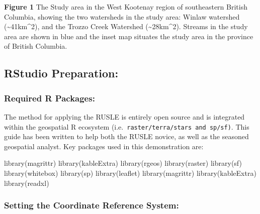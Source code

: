 \documentclass[
]{article}
\newenvironment{Shaded}{\begin{snugshade}}{\end{snugshade}}
\newcommand{\FunctionTok}[1]{\textcolor[rgb]{0.00,0.00,0.00}{#1}}
\newcommand{\NormalTok}[1]{#1}
\begin{document}
\textbf{Figure 1} The Study area in the West Kootenay region of southeastern British Columbia, showing the two watersheds in the study area: Winlaw watershed (\textasciitilde41km\^{}2), and the Trozzo Creek Watershed (\textasciitilde28km\^{}2). Streams in the study area are shown in blue and the inset map situates the study area in the province of British Columbia.

\hypertarget{sec-required-r-packages}{%
\subsection*{RStudio Preparation:}\label{sec-required-r-packages}}

\hypertarget{packages}{%
\subsubsection*{Required R Packages:}\label{packages}}

The method for applying the RUSLE is entirely open source and is integrated within the geospatial R ecosystem (i.e.~\texttt{raster/terra/stars\ and\ sp/sf)}. This guide has been written to help both the RUSLE novice, as well as the seasoned geospatial analyst. Key packages used in this demonstration are:

\begin{Shaded}
\begin{Highlighting}[]
\FunctionTok{library}\NormalTok{(magrittr)}
\FunctionTok{library}\NormalTok{(kableExtra) }
\FunctionTok{library}\NormalTok{(rgeos)}
\FunctionTok{library}\NormalTok{(raster)}
\FunctionTok{library}\NormalTok{(sf)}
\FunctionTok{library}\NormalTok{(whitebox)}
\FunctionTok{library}\NormalTok{(sp)}
\FunctionTok{library}\NormalTok{(leaflet)}
\FunctionTok{library}\NormalTok{(magrittr)}
\FunctionTok{library}\NormalTok{(kableExtra)}
\FunctionTok{library}\NormalTok{(readxl)}
\end{Highlighting}
\end{Shaded}

\hypertarget{sec-rstudio-preparation}{%
\subsubsection*{Setting the Coordinate Reference System:}\label{sec-rstudio-preparation}}
\end{document}
